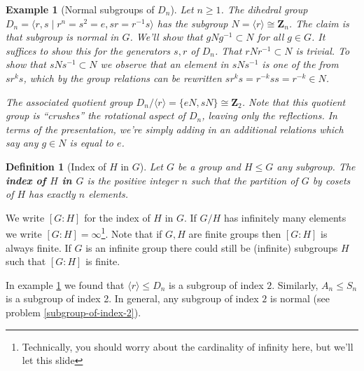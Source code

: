 \documentclass[12pt]{article}
\numberwithin{equation}{subsection}
\newtheorem{defn}[subsection]{Definition}
\theoremstyle{note}
\newtheorem{example}[subsection]{Example}
\begin{document}
\begin{example}[Normal subgroups of $D_n$] \label{ex-Dn-normal} Let $n\geq 1$. The dihedral group $D_n=\langle r, s \mid r^n=s^2=e, sr=r^{-1}s\rangle$ has the subgroup $N=\langle r\rangle \cong \mathbf{Z}_n$. The claim is that subgroup is normal in $G$. We'll show that $gNg^{-1}\subset N$ for all $g\in G$. It suffices to show this for the generators $s,r$ of $D_n$. That $rNr^{-1}\subset N$ is trivial. To show that $sNs^{-1}\subset N$ we observe that an element in $sNs^{-1}$ is one of the from $sr^ks$, which by the group relations can be rewritten $sr^ks=r^{-k}ss=r^{-k}\in N$. 
	
	The associated quotient group $D_n/\langle r\rangle= \{eN, sN\}\cong \mathbf{Z}_2$. Note that this quotient group is ``crushes'' the rotational aspect of $D_n$, leaving only the reflections. In terms of the presentation, we're simply adding in an additional relations which say any $g\in N$ is equal to $e$. 
\end{example}


\begin{defn}[Index of $H$ in $G$]
Let $G$ be a group and $H\leq G$ any subgroup. The \textbf{index of $H$ in $G$} is the positive integer $n$ such that the partition of $G$ by cosets of $H$ has exactly $n$ elements. 
\end{defn}
We write $[G:H]$ for the index of $H$ in $G$. If $G/H$ has infinitely many elements we write $[G:H]=\infty$\footnote{Technically, you should worry about the cardinality of infinity here, but we'll let this slide}. Note that if $G,H$ are finite groups then $[G:H]$ is always finite. If $G$ is an infinite group there could still be (infinite) subgroups $H$ such that $[G:H]$ is finite. 

In example \ref{ex-Dn-normal} we found that $\langle r\rangle \leq D_n$ is a subgroup of index $2$. Similarly, $A_n\leq S_n$ is a subgroup of index 2. In general, any subgroup of index $2$ is normal (see problem \ref{subgroup-of-index-2}). 


\end{document}
